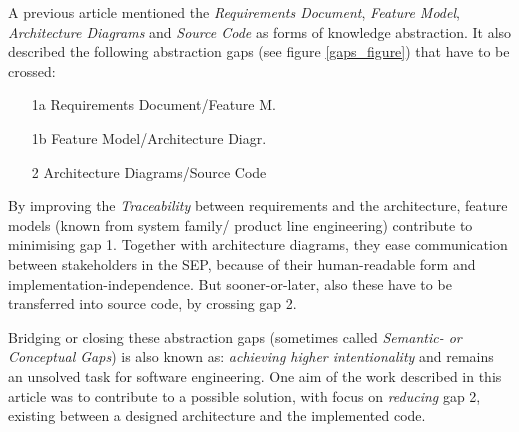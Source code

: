 A previous article \cite{heller2004} mentioned the \emph{Requirements Document},
\emph{Feature Model}, \emph{Architecture Diagrams} and \emph{Source Code} as
forms of knowledge abstraction. It also described the following abstraction
gaps (see figure \ref{gaps_figure}) that have to be crossed:

\begin{enumerate}
    \item[1a] Requirements Document/Feature M.
    \item[1b] Feature Model/Architecture Diagr.
    \item[2] Architecture Diagrams/Source Code
\end{enumerate}

By improving the \emph{Traceability} between requirements and the architecture,
feature models (known from system family/ product line engineering) contribute
to minimising gap 1. Together with architecture diagrams, they ease
communication between stakeholders in the SEP, because of their human-readable
form and implementation-independence. But sooner-or-later, also these have to
be transferred into source code, by crossing gap 2.

Bridging or closing these abstraction gaps (sometimes called \emph{Semantic- or
Conceptual Gaps}) is also known as: \textit{achieving higher intentionality}
and remains an unsolved task for software engineering. One aim of the work
described in this article was to contribute to a possible solution, with focus
on \emph{reducing} gap 2, existing between a designed architecture and the
implemented code.
